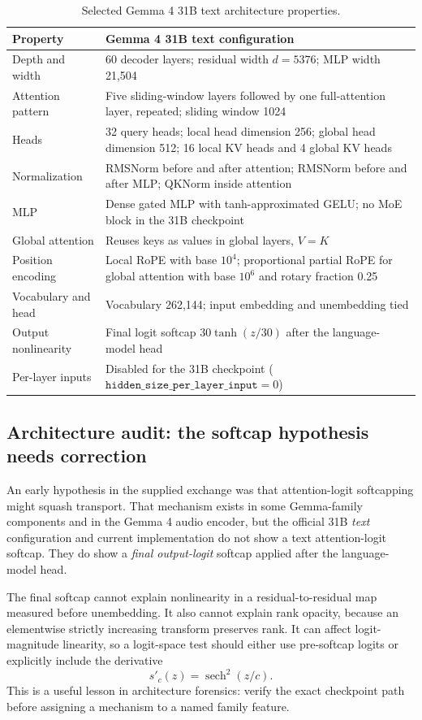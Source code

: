 \documentclass[11pt]{article}
\theoremstyle{definition}
\theoremstyle{remark}
\begin{document}
\begin{table}[H]
\centering
\small
\caption{Selected Gemma 4 31B text architecture properties.}
\label{tab:gemma_arch}
\begin{tabularx}{\textwidth}{@{}p{}X@{}}
\toprule
\textbf{Property} & \textbf{Gemma 4 31B text configuration}\\
\midrule
Depth and width & 60 decoder layers; residual width $d=5376$; MLP width 21,504\\
Attention pattern & Five sliding-window layers followed by one full-attention layer, repeated; sliding window 1024\\
Heads & 32 query heads; local head dimension 256; global head dimension 512; 16 local KV heads and 4 global KV heads\\
Normalization & RMSNorm before and after attention; RMSNorm before and after MLP; QKNorm inside attention\\
MLP & Dense gated MLP with tanh-approximated GELU; no MoE block in the 31B checkpoint\\
Global attention & Reuses keys as values in global layers, $V=K$\\
Position encoding & Local RoPE with base $10^4$; proportional partial RoPE for global attention with base $10^6$ and rotary fraction 0.25\\
Vocabulary and head & Vocabulary 262,144; input embedding and unembedding tied\\
Output nonlinearity & Final logit softcap $30\tanh(z/30)$ after the language-model head\\
Per-layer inputs & Disabled for the 31B checkpoint ($\texttt{hidden\_size\_per\_layer\_input}=0$)\\
\bottomrule
\end{tabularx}
\end{table}

\subsection{Architecture audit: the softcap hypothesis needs correction}
An early hypothesis in the supplied exchange was that attention-logit softcapping might squash transport. That mechanism exists in some Gemma-family components and in the Gemma 4 audio encoder, but the official 31B \emph{text} configuration and current implementation do not show a text attention-logit softcap. They do show a \emph{final output-logit} softcap applied after the language-model head.

\begin{warningbox}
The final softcap cannot explain nonlinearity in a residual-to-residual map measured before unembedding. It also cannot explain rank opacity, because an elementwise strictly increasing transform preserves rank. It can affect logit-magnitude linearity, so a logit-space test should either use pre-softcap logits or explicitly include the derivative
\[
  s'_c(z)=\operatorname{sech}^2(z/c).
\]
This is a useful lesson in architecture forensics: verify the exact checkpoint path before assigning a mechanism to a named family feature.
\end{warningbox}
\end{document}
